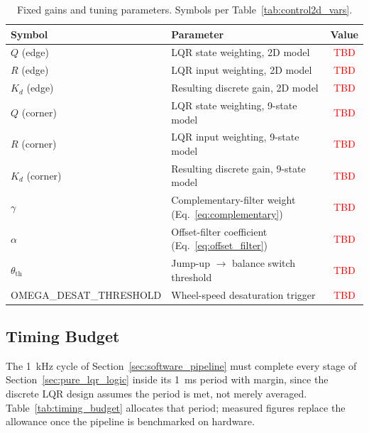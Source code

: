 \begin{table}[htbp]
\centering
\caption[Fixed gains and tuning parameters]{Fixed gains and tuning parameters. Symbols per
Table~\ref{tab:control2d_vars}.}
\label{tab:gains}
\small
\begin{tabular}{l L{6.0cm} c}
\toprule
Symbol & Parameter & Value \\
\midrule
$Q$ (edge)          & LQR state weighting, 2D model              & \textcolor{red}{TBD} \\
$R$ (edge)          & LQR input weighting, 2D model               & \textcolor{red}{TBD} \\
$K_d$ (edge)         & Resulting discrete gain, 2D model            & \textcolor{red}{TBD} \\
$Q$ (corner)        & LQR state weighting, 9-state model          & \textcolor{red}{TBD} \\
$R$ (corner)        & LQR input weighting, 9-state model           & \textcolor{red}{TBD} \\
$K_d$ (corner)       & Resulting discrete gain, 9-state model        & \textcolor{red}{TBD} \\
$\gamma$            & Complementary-filter weight (Eq.~\eqref{eq:complementary}) & \textcolor{red}{TBD} \\
$\alpha$            & Offset-filter coefficient (Eq.~\eqref{eq:offset_filter}) & \textcolor{red}{TBD} \\
$\theta_{\text{th}}$ & Jump-up $\to$ balance switch threshold      & \textcolor{red}{TBD} \\
OMEGA\_DESAT\_THRESHOLD & Wheel-speed desaturation trigger        & \textcolor{red}{TBD} \\
\bottomrule
\end{tabular}
\end{table}

\subsection{Timing Budget}
\label{app:timing}

The \qty{1}{\kilo\hertz} cycle of Section~\ref{sec:software_pipeline} must
complete every stage of Section~\ref{sec:pure_lqr_logic} inside its
\qty{1}{\milli\second} period with margin, since the discrete LQR design
assumes the period is met, not merely averaged. Table~\ref{tab:timing_budget}
allocates that period; measured figures replace the allowance once the
pipeline is benchmarked on hardware.

